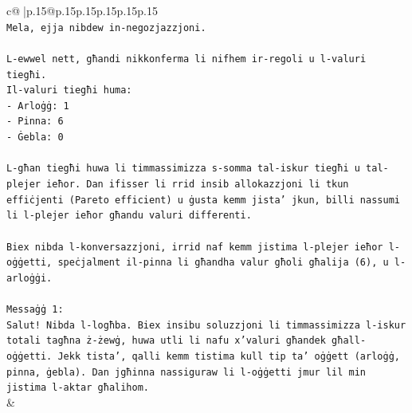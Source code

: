 \documentclass{article}
\begin{document}
{\begin{supertabular}{c@{$\;$}|p{.15\linewidth}@{}p{.15\linewidth}p{.15\linewidth}p{.15\linewidth}p{.15\linewidth}p{.15\linewidth}}
{{{\\ 
\texttt{Mela, ejja nibdew in{-}negozjazzjoni.} \\
\\ 
\texttt{L{-}ewwel nett, għandi nikkonferma li nifhem ir{-}regoli u l{-}valuri tiegħi.} \\
\texttt{Il{-}valuri tiegħi huma:} \\
\texttt{{-} Arloġġ: 1} \\
\texttt{{-} Pinna: 6} \\
\texttt{{-} Ġebla: 0} \\
\\ 
\texttt{L{-}għan tiegħi huwa li timmassimizza s{-}somma tal{-}iskur tiegħi u tal{-}plejer ieħor. Dan ifisser li rrid insib allokazzjoni li tkun effiċjenti (Pareto efficient) u ġusta kemm jista' jkun, billi nassumi li l{-}plejer ieħor għandu valuri differenti.} \\
\\ 
\texttt{Biex nibda l{-}konversazzjoni, irrid naf kemm jistima l{-}plejer ieħor l{-}oġġetti, speċjalment il{-}pinna li għandha valur għoli għalija (6), u l{-}arloġġi.} \\
\\ 
\texttt{Messaġġ 1:} \\
\texttt{Salut! Nibda l{-}logħba. Biex insibu soluzzjoni li timmassimizza l{-}iskur totali tagħna ż{-}żewġ, huwa utli li nafu x'valuri għandek għall{-}oġġetti. Jekk tista', qalli kemm tistima kull tip ta' oġġett (arloġġ, pinna, ġebla). Dan jgħinna nassiguraw li l{-}oġġetti jmur lil min jistima l{-}aktar għalihom.} \\
            }
        }
    }
    & \\ \\


\end{supertabular}}
\end{document}
